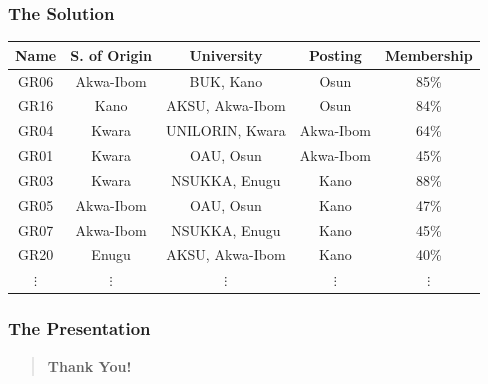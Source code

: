 \documentclass[10pt]{beamer}
\begin{document}
			\begin{frame}
				\frametitle{The Solution}				
				\begin{center}
					\begin{tabular}{|c|c|c|c|c|}
						\hline
							\textbf{Name} & \textbf{S. of Origin} & \textbf{University} & \textbf{Posting} & \textbf{Membership} \\
							\hline
							GR06 & Akwa-Ibom & BUK, Kano & Osun & 85\% \\
							\hline
							GR16 & Kano & AKSU, Akwa-Ibom & Osun & 84\% \\
							\hline
							GR04 & Kwara & UNILORIN, Kwara & Akwa-Ibom & 64\% \\
							\hline
							GR01 & Kwara & OAU, Osun & Akwa-Ibom & 45\% \\
							\hline
							GR03 & Kwara & NSUKKA, Enugu & Kano & 88\% \\
							\hline
							GR05 & Akwa-Ibom & OAU, Osun & Kano & 47\% \\
							\hline
							GR07 & Akwa-Ibom & NSUKKA, Enugu & Kano & 45\% \\
							\hline
							GR20 & Enugu & AKSU, Akwa-Ibom & Kano & 40\% \\
							\hline
							$\vdots$ & $\vdots$ & $\vdots$ & $\vdots$ & $\vdots$ \\
							\hline
					\end{tabular}		
				\end{center}
			\end{frame}
			
			\begin{frame}
				\frametitle{The Presentation}	
				\begin{center}			
					\begin{quote}
						\centering \textbf{Thank You!}
					\end{quote}					
				\end{center}
			\end{frame}


\end{document}
